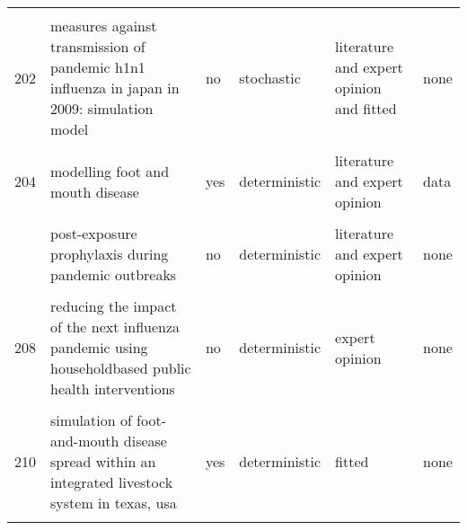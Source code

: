 \documentclass[
]{article}
\begin{document}
\begin{landscape}
\begin{longtable}{l>{\raggedright\arraybackslash}p{3cm}l>{\raggedright\arraybackslash}p{3cm}ll}
\addlinespace
\cellcolor{gray!6}{201} & \cellcolor{gray!6}{household epidemics: modelling effects of early stage vaccination} & \cellcolor{gray!6}{yes} & \cellcolor{gray!6}{stochastic} & \cellcolor{gray!6}{literature} & \cellcolor{gray!6}{none}\\
202 & measures against transmission of pandemic h1n1 influenza in japan in 2009: simulation model & no & stochastic & literature and expert opinion and fitted & none\\
\cellcolor{gray!6}{203} & \cellcolor{gray!6}{modeling vaccination campaigns and the fall/winter 2009 activity of the new a(h1n1) influenza in the northern hemisphere} & \cellcolor{gray!6}{yes} & \cellcolor{gray!6}{stochastic} & \cellcolor{gray!6}{literature and fitted} & \cellcolor{gray!6}{data}\\
204 & modelling foot and mouth disease & yes & deterministic & literature and expert opinion & data\\
\cellcolor{gray!6}{205} & \cellcolor{gray!6}{modelling of the influenza a(h1n1)v outbreak in mexico city, april-may 2009, with control sanitary measures} & \cellcolor{gray!6}{no} & \cellcolor{gray!6}{deterministic} & \cellcolor{gray!6}{expert opinion and fitted} & \cellcolor{gray!6}{none}\\
\addlinespace
206 & post-exposure prophylaxis during pandemic outbreaks & no & deterministic & literature and expert opinion & none\\
\cellcolor{gray!6}{207} & \cellcolor{gray!6}{potential for a global dynamic of influenza a (h1n1)} & \cellcolor{gray!6}{yes} & \cellcolor{gray!6}{stochastic} & \cellcolor{gray!6}{literature and expert opinion} & \cellcolor{gray!6}{none}\\
208 & reducing the impact of the next influenza pandemic using householdbased public health interventions & no & deterministic & expert opinion & none\\
\cellcolor{gray!6}{209} & \cellcolor{gray!6}{seasonal transmission potential and activity peaks of the new influenza a(h1n1): a monte carlo likelihood analysis based on human mobility} & \cellcolor{gray!6}{yes} & \cellcolor{gray!6}{stochastic} & \cellcolor{gray!6}{literature and fitted} & \cellcolor{gray!6}{data}\\
210 & simulation of foot-and-mouth disease spread within an integrated livestock system in texas, usa & yes & deterministic & fitted & none\\
\addlinespace
\cellcolor{gray!6}{211} & \cellcolor{gray!6}{the transmissibility and control of pandemic influenza a (h1n1) virus} & \cellcolor{gray!6}{no} & \cellcolor{gray!6}{stochastic} & \cellcolor{gray!6}{literature and expert opinion and fitted} & \cellcolor{gray!6}{data}\\

\end{longtable}
\end{landscape}
\end{document}
